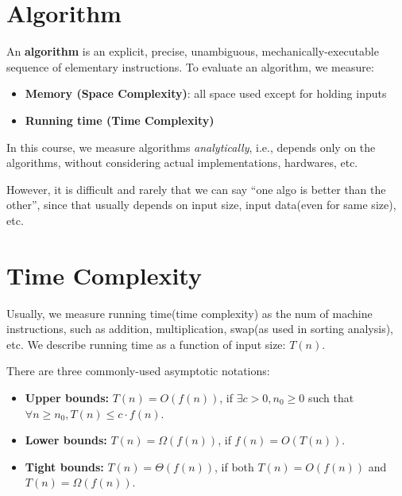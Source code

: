 
\begin{spacing}{1.3}
    
    \section{Algorithm}

    An \textbf{algorithm} is an explicit, precise, unambiguous, mechanically-executable
    sequence of elementary instructions. To evaluate an algorithm, we measure:
    \begin{itemize}
        \item {\bf Memory (Space Complexity)}: 
        all space used except for holding inputs
        \item {\bf Running time (Time Complexity)}  
    \end{itemize}

    In this course, we measure algorithms {\it analytically}, i.e., 
    depends only on the algorithms, without considering actual
    implementations, hardwares, etc. 

    However, it is difficult and rarely that we can say
    ``one algo is better than the other'', since that usually 
    depends on input size, input data(even for same size), etc.

    \section{Time Complexity}

    Usually, we measure running time(time complexity) as the num
    of machine instructions, such as addition, multiplication,
    swap(as used in sorting analysis), etc. We describe running time
    as a function of input size: $T(n)$.

    There are three commonly-used asymptotic notations:
    \begin{itemize}
        \item {\bf Upper bounds:} $T(n)=O(f(n))$, if
        $\exists c>0, n_0\ge 0$ such that 
        $\forall n\ge n_0, T(n)\le c\cdot f(n)$.
        \item {\bf Lower bounds:} $T(n)=\Omega(f(n))$, 
        if $f(n)=O(T(n))$.
        \item {\bf Tight bounds:} $T(n)=\Theta(f(n))$,
        if both $T(n)=O(f(n))$ and $T(n)=\Omega (f(n))$.
    \end{itemize}


\end{spacing}
